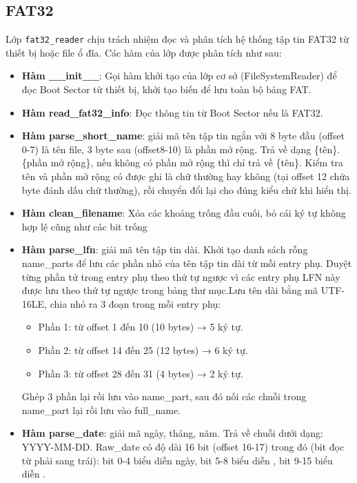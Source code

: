 \subsection{FAT32}

Lớp \texttt{fat32\_reader} chịu trách nhiệm đọc và phân tích hệ thống tập tin FAT32 từ thiết bị hoặc file ổ đĩa. Các hàm của lớp được phân tích như sau:

\begin{itemize}
\item \textbf{Hàm \_\_init\_\_}: Gọi hàm khởi tạo của lớp cơ sở (FileSystemReader) để đọc Boot Sector từ thiết bị, khởi tạo biến để lưu toàn bộ bảng FAT.
\item \textbf{Hàm read\_fat32\_info}: Đọc thông tin từ Boot Sector nếu là FAT32.
\item \textbf{Hàm parse\_short\_name}: giải mã tên tập tin ngắn với 8 byte đầu (offset 0-7) là tên file, 3 byte sau (offset8-10) là phần mở rộng. Trả về dạng \{tên\}.\{phần mở rộng\}, nếu không có phần mở rộng thì chỉ trả về \{tên\}. Kiểm tra tên và phần mở rộng có được ghi là chữ thường hay không (tại offset 12 chứa byte đánh dấu chữ thường), rồi chuyển đổi lại cho đúng kiểu chữ khi hiển thị.
\item \textbf{Hàm clean\_filename}: Xóa các khoảng trống đầu cuối, bỏ cái ký tự không hợp lệ cũng như các bit trống

\item \textbf{Hàm parse\_lfn}: giải mã tên tập tin dài. Khởi tạo danh sách rỗng name\_parts để lưu các phần nhỏ của tên tập tin dài từ mỗi entry phụ. Duyệt từng phần tử trong entry phụ theo thứ tự ngược vì các entry phụ LFN này được lưu theo thứ tự ngược trong bảng thư mục.Lưu tên dài bằng mã UTF-16LE, chia nhỏ ra 3 đoạn trong mỗi entry phụ:
    \begin{itemize}
    \item Phần 1: từ offset 1 đến 10 (10 bytes) → 5 ký tự.
    \item Phần 2: từ offset 14 đến 25 (12 bytes) → 6 ký tự.
    \item Phần 3: từ offset 28 đến 31 (4 bytes) → 2 ký tự.
    \end{itemize} 
Ghép 3 phần lại rồi lưu vào name\_part, sau đó nối các chuỗi trong name\_part lại rồi lưu vào full\_name.
\item \textbf { Hàm parse\_date}: giải mã ngày, tháng, năm. Trả về chuỗi dưới dạng: YYYY-MM-DD. Raw\_date có độ dài 16 bit (offset 16-17) trong đó (bit đọc từ phải sang trái): bit 0-4 biểu diễn ngày, bit 5-8 biểu diễn , bit 9-15 biểu diễn .
   

\end{itemize}
